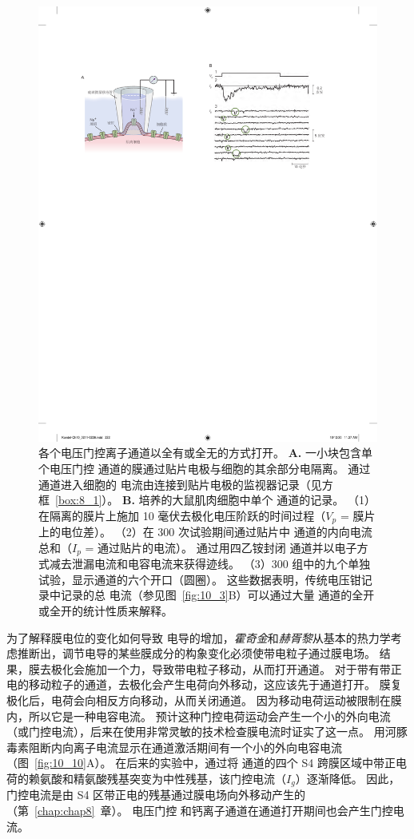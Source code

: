 \begin{figure}[htbp]
	\centering
	\includegraphics[width=0.9\linewidth]{chap10/fig_10_9}
	\caption{各个电压门控离子通道以全有或全无的方式打开。
		\textbf{A.} 一小块包含单个电压门控  通道的膜通过贴片电极与细胞的其余部分电隔离。
		通过通道进入细胞的  电流由连接到贴片电极的监视器记录（见方框~\ref{box:8_1}）。
		\textbf{B.} 培养的大鼠肌肉细胞中单个  通道的记录。
		（1）在隔离的膜片上施加 10 毫伏去极化电压阶跃的时间过程（$V_p$ = 膜片上的电位差）。
		（2）在 300 次试验期间通过贴片中  通道的内向电流总和（$I_p$ = 通过贴片的电流）。
		通过用四乙铵封闭  通道并以电子方式减去泄漏电流和电容电流来获得迹线。
		（3）300 组中的九个单独试验，显示通道的六个开口（圆圈）。
		这些数据表明，传统电压钳记录中记录的总  电流（参见图~\ref{fig:10_3}B）可以通过大量  通道的全开或全开的统计性质来解释\cite{sigworth1980single}。}
	\label{fig:10_9}
\end{figure}


为了解释膜电位的变化如何导致  电导的增加，\textit{霍奇金}和\textit{赫胥黎}从基本的热力学考虑推断出，调节电导的某些膜成分的构象变化必须使带电粒子通过膜电场。
结果，膜去极化会施加一个力，导致带电粒子移动，从而打开通道。
对于带有带正电的移动粒子的通道，去极化会产生电荷向外移动，这应该先于通道打开。
膜复极化后，电荷会向相反方向移动，从而关闭通道。 
因为移动电荷运动被限制在膜内，所以它是一种电容电流。
预计这种门控电荷运动会产生一个小的外向电流（或门控电流），后来在使用非常灵敏的技术检查膜电流时证实了这一点。
用河豚毒素阻断内向离子电流显示在通道激活期间有一个小的外向电容电流（图~\ref{fig:10_10}A）。 
在后来的实验中，通过将  通道的四个 S4 跨膜区域中带正电荷的赖氨酸和精氨酸残基突变为中性残基，该门控电流（$I_g$）逐渐降低。 
因此，门控电流是由 S4 区带正电的残基通过膜电场向外移动产生的（第~\ref{chap:chap8}~章）。 
电压门控  和钙离子通道在通道打开期间也会产生门控电流。


